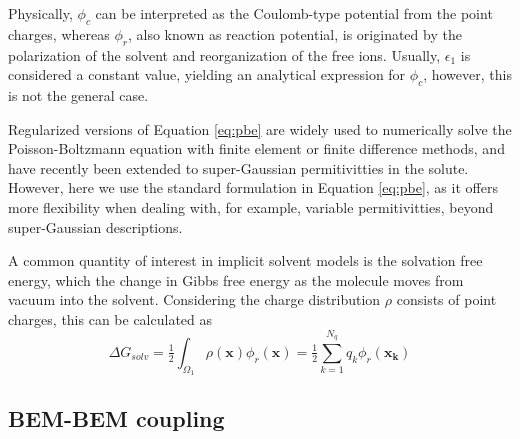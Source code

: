 Physically, $\phi_c$ can be interpreted as the Coulomb-type potential from the point charges, whereas $\phi_r$, also known as reaction potential, is originated by the polarization of the solvent and reorganization of the free ions. 
Usually, $\epsilon_1$ is considered a constant value, yielding an analytical expression for $\phi_c$, however, this is not the general case.

Regularized versions of Equation \eqref{eq:pbe} \cite{LuZhouHolstMcCammon2008,LeeGengZhao2021} are widely used to numerically solve the Poisson-Boltzmann equation with finite element or finite difference methods, and have recently been extended to super-Gaussian permitivitties in the solute.\cite{wang2022regularization} However, here we use the standard formulation in Equation \eqref{eq:pbe}, as it offers more flexibility when dealing with, for example, variable permitivitties, beyond super-Gaussian descriptions.

A common quantity of interest in implicit solvent models is the solvation free energy, which the change in Gibbs free energy as the molecule moves from vacuum into the solvent. Considering the charge distribution $\rho$ consists of point charges, this can be calculated as
%
\begin{equation}\label{eq:dG} 
\Delta G_{solv} = \tfrac{1}{2}\int_{\Omega_1} \rho(\mathbf{x})\phi_{r}(\mathbf{x}) = \tfrac{1}{2}\sum_{k=1}^{N_q} q_k\phi_r(\mathbf{x_k})
\end{equation}

\subsection*{\sffamily \large BEM-BEM coupling}

